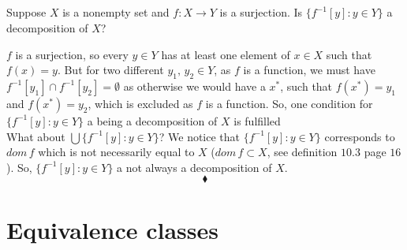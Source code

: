 \subsection{}
\begin{tcolorbox}
Suppose $X$ is a nonempty set and $f:X\rightarrow Y$ is a surjection. Is $\{f^{-1}[y]: y\in Y\}$ a decomposition of $X$? 
\end{tcolorbox}
$$ $$
$f$ is a surjection, so every $y\in Y$ has at least one element of $x\in X$ such that $f(x) = y$. But for two different $y_1,\, y_2\in Y$, as $f$ is a function, we must have $f^{-1}[y_1]\cap f^{-1}[y_2]= \emptyset$ as otherwise we would have a $x^*$, such that $f(x^*)=y_1$ and $f(x^*)=y_2$, which is excluded as $f$ is a function. So, one condition for $\{f^{-1}[y]: y\in Y\}$ a being a decomposition of $X$ is fulfilled\\
What about $\bigcup\{f^{-1}[y]: y\in Y\}$? We notice that $\{f^{-1}[y]: y\in Y\}$ corresponds to  $dom\, f$ which is not necessarily equal to $X$ ($dom\, f\subset X$, see definition $\mathbf{10.3}$ page $16$). So, $\{f^{-1}[y]: y\in Y\}$ a not always a decomposition of $X$.
$$\blacklozenge$$

\newpage


 \section{Equivalence classes}
